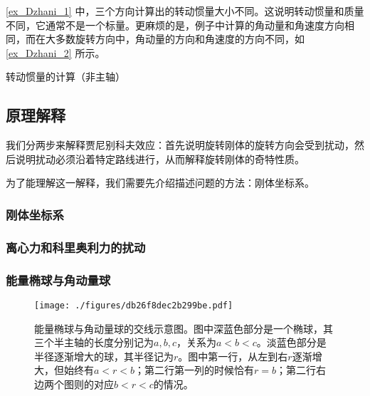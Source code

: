 \autoref{ex_Dzhani_1} 中，三个方向计算出的转动惯量大小不同。这说明转动惯量和质量不同，它通常不是一个标量。更麻烦的是，例子中计算的角动量和角速度方向相同，而在大多数旋转方向中，角动量的方向和角速度的方向不同，如\autoref{ex_Dzhani_2} 所示。


\begin{example}{转动惯量的计算（非主轴）}\label{ex_Dzhani_2}



\end{example}





\subsection{原理解释}

我们分两步来解释贾尼别科夫效应：首先说明旋转刚体的旋转方向会受到扰动，然后说明扰动必须沿着特定路线进行，从而解释旋转刚体的奇特性质。

为了能理解这一解释，我们需要先介绍描述问题的方法：刚体坐标系。

\subsubsection{刚体坐标系}



\subsubsection{离心力和科里奥利力的扰动}







\subsubsection{能量椭球与角动量球}


\begin{figure}[ht]
\centering
\texttt{[image: ./figures/db26f8dec2b299be.pdf]}
\caption{能量椭球与角动量球的交线示意图。图中深蓝色部分是一个椭球，其三个半主轴的长度分别记为$a, b, c$，关系为$a<b<c$。淡蓝色部分是半径逐渐增大的球，其半径记为$r$。图中第一行，从左到右$r$逐渐增大，但始终有$a<r<b$；第二行第一列的时候恰有$r=b$；第二行右边两个图则的对应$b<r<c$的情况。} \label{fig_Dzhani_7}
\end{figure}


















